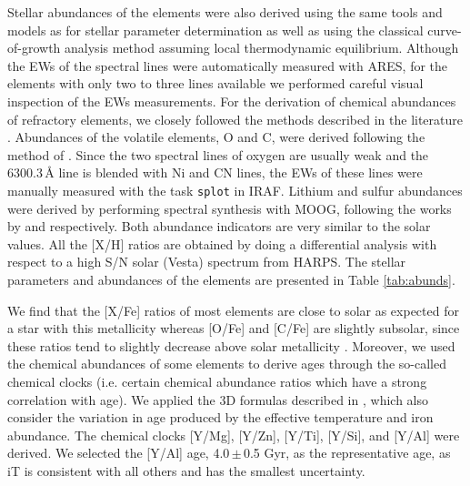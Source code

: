 \documentclass[fleqn,usenatbib]{mnras}
\newcommand{\Tstarage}{4.0\,$\pm$\,0.5 Gyr}
\begin{document}
Stellar abundances of the elements were also derived using the same tools and models as for stellar parameter determination as well as using the classical curve-of-growth analysis method assuming local thermodynamic equilibrium. Although the EWs of the spectral lines were automatically measured with ARES, for the elements with only two to three lines available we performed careful visual inspection of the EWs measurements. For the derivation of chemical abundances of refractory elements, we closely followed the methods described in the literature \citep[e.g.][]{Adibekyan-12, Adibekyan-15, Delgado-14, Delgado-17}. Abundances of the volatile elements, O and C, were derived following the method of \cite{Delgado-10, 2015A&A...576A..89B}. Since the two spectral lines of oxygen are usually weak and the 6300.3\,\AA{} line is blended with Ni and CN lines, the EWs of these lines were manually measured with the task \texttt{splot} in IRAF. Lithium and sulfur abundances were derived by performing spectral synthesis with MOOG, following the works by \citet{Delgado-14} and \citet{Costa_Silva2020} respectively. Both abundance indicators are very similar to the solar values.
All the [X/H] ratios are obtained by doing a differential analysis with respect to a high S/N solar (Vesta) spectrum from HARPS. The stellar parameters and abundances of the elements are presented in Table \ref{tab:abunds}. 

We find that the [X/Fe] ratios of most elements are close to solar as expected for a star with this metallicity whereas [O/Fe] and [C/Fe] are slightly subsolar, since these ratios tend to slightly decrease above solar metallicity \cite[e.g.][]{Bertrandelis-15,Franchini2020}. Moreover, we used the chemical abundances of some elements to derive ages through the so-called chemical clocks (i.e. certain chemical abundance ratios which have a strong correlation with age). We applied the 3D formulas described in \citet{Delgado-19}, which also consider the variation in age produced by the effective temperature and iron abundance. The chemical clocks [Y/Mg], [Y/Zn], [Y/Ti], [Y/Si], and [Y/Al] were derived. We selected the [Y/Al] age, \Tstarage{}, as the representative age, as iT is consistent with all others and has the smallest uncertainty.
\end{document}
